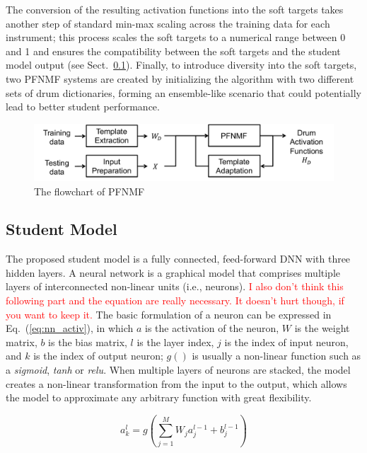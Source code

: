 \documentclass{article}
\begin{document}
The conversion of the resulting activation functions into the soft targets takes another step of standard min-max scaling across the training data for each instrument; this process scales the soft targets to a numerical range between 0 and 1 and ensures the compatibility between the soft targets and the student model output (see Sect.~\ref{subsec:nn}). Finally, to introduce diversity into the soft targets, two PFNMF systems are created by initializing the algorithm with two different sets of drum dictionaries, forming an ensemble-like scenario that could potentially lead to better student performance. %

\begin{figure}
\centering
\includegraphics[width = 8 cm]{./figs/nmf_flowchart_remake.pdf}
\caption{The flowchart of PFNMF \cite{Wu2015a}}
\label{fig:pfnmf}
\end{figure}

\subsection{Student Model}\label{subsec:nn}
The proposed student model is a fully connected, feed-forward DNN with three hidden layers. A neural network is a graphical model that comprises multiple layers of interconnected non-linear units (i.e., neurons). {\textcolor{red}{I also don't think this following part and the equation are really necessary. It doesn't hurt though, if you want to keep it.}} The basic formulation of a neuron can be expressed in Eq.~(\ref{eq:nn_activ}), in which $a$ is the activation of the neuron, $W$ is the weight matrix, $b$ is the bias matrix, $l$ is the layer index, $j$ is the index of input neuron, and $k$ is the index of output neuron; $g( )$ is usually a non-linear function such as a \textit{sigmoid}, \textit{tanh} or \textit{relu}. When multiple layers of neurons are stacked, the model creates a non-linear transformation from the input to the output, which allows the model to approximate any arbitrary function with great flexibility. 

\begin{equation}\label{eq:nn_activ}
a_{k}^{l} = g\left( \sum_{j=1}^{M} W_{j} a_{j}^{l-1} + b_{j}^{l-1}\right)
\end{equation}
\end{document}

